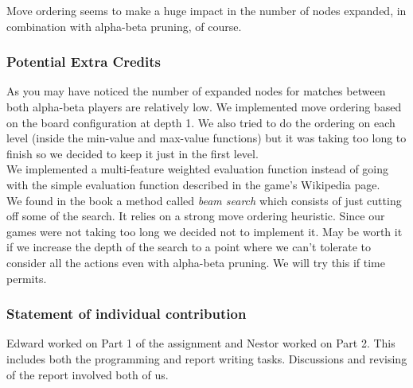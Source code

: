 \documentclass[11pt]{article}
\begin{document}
Move ordering seems to make a huge impact in the number of nodes expanded, in combination with alpha-beta pruning, of course.

\subsubsection*{Potential Extra Credits}
As you may have noticed the number of expanded nodes for matches between both alpha-beta players are relatively low. We implemented move ordering based on the board configuration at depth 1. We also tried to do the ordering  on each level (inside the min-value and max-value functions) but it was taking too long to finish so we decided to keep it just in the first level.\\

We implemented a multi-feature weighted evaluation function instead of going with the simple evaluation function described in the game's Wikipedia page.\\

We found in the book a method called \textit{beam search} which consists of just cutting off some of the search. It relies on a strong move ordering heuristic. Since our games were not taking too long we decided not to implement it. May be worth it if we increase the depth of the search to a point where we can't tolerate to consider all the actions even with alpha-beta pruning. We will try this if time permits.\\

\subsubsection*{Statement of individual contribution}
Edward worked on Part 1 of the assignment and Nestor worked on Part 2. This includes both the programming and report writing tasks. Discussions and revising of the report involved both of us.
\end{document}

